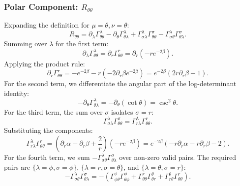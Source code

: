 \documentclass[11pt, a4paper]{report}
\begin{document}
\subsubsection{Polar Component: $R_{\theta\theta}$}
Expanding the definition for $\mu=\theta, \nu=\theta$:
\begin{equation}
R_{\theta\theta} = \partial_\lambda \Gamma^\lambda_{\theta\theta} - \partial_\theta \Gamma^\lambda_{\theta\lambda} + \Gamma^\lambda_{\sigma\lambda} \Gamma^\sigma_{\theta\theta} - \Gamma^\lambda_{\sigma\theta} \Gamma^\sigma_{\theta\lambda}.
\end{equation}
Summing over $\lambda$ for the first term:
\begin{equation}
\partial_\lambda \Gamma^\lambda_{\theta\theta} = \partial_r \Gamma^r_{\theta\theta} = \partial_r \left( -re^{-2\beta} \right).
\end{equation}
Applying the product rule:
\begin{equation}
\partial_r \Gamma^r_{\theta\theta} = -e^{-2\beta} - r \left( -2\partial_r\beta e^{-2\beta} \right) = e^{-2\beta} \left( 2r\partial_r\beta - 1 \right).
\end{equation}
For the second term, we differentiate the angular part of the log-determinant identity:
\begin{equation}
-\partial_\theta \Gamma^\lambda_{\theta\lambda} = -\partial_\theta (\cot\theta) = \csc^2\theta.
\end{equation}
For the third term, the sum over $\sigma$ isolates $\sigma=r$:
\begin{equation}
\Gamma^\lambda_{\sigma\lambda} \Gamma^\sigma_{\theta\theta} = \Gamma^\lambda_{r\lambda} \Gamma^r_{\theta\theta}.
\end{equation}
Substituting the components:
\begin{equation}
\Gamma^\lambda_{r\lambda} \Gamma^r_{\theta\theta} = \left( \partial_r\alpha + \partial_r\beta + \frac{2}{r} \right) \left( -re^{-2\beta} \right) = e^{-2\beta} \left( -r\partial_r\alpha - r\partial_r\beta - 2 \right).
\end{equation}
For the fourth term, we sum $-\Gamma^\lambda_{\sigma\theta} \Gamma^\sigma_{\theta\lambda}$ over non-zero valid pairs. The required pairs are $\{\lambda=\phi, \sigma=\phi\}$, $\{\lambda=r, \sigma=\theta\}$, and $\{\lambda=\theta, \sigma=r\}$:
\begin{equation}
-\Gamma^\lambda_{\sigma\theta} \Gamma^\sigma_{\theta\lambda} = -\left( \Gamma^\phi_{\phi\theta} \Gamma^\phi_{\theta\phi} + \Gamma^r_{\theta\theta} \Gamma^\theta_{\theta r} + \Gamma^\theta_{r\theta} \Gamma^r_{\theta\theta} \right).
\end{equation}
\end{document}
